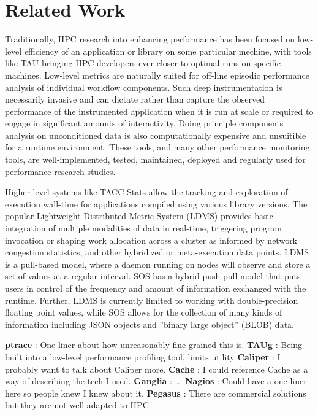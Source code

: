 \section{Related Work}

Traditionally, HPC research into enhancing performance has been
focused on low-level efficiency of an application or library on some
particular mechine, with tools like TAU bringing HPC developers ever
closer to optimal runs on specific machines.
%
Low-level metrics are naturally suited for off-line episodic
performance analysis of individual workflow components.
%
Such deep instrumentation is necessarily invasive and can dictate
rather than capture the observed performance of the instrumented
application when it is run at scale or required to engage in
significant amounts of interactivity.
%
Doing principle components analysis on unconditioned data is also
computationally expensive and unsuitible for a runtime environment.
%
These tools, and many other performance monitoring tools, are
well-implemented, tested, maintained, deployed and regularly used for
performance research studies.

Higher-level systems like TACC Stats \cite{evans2014comprehensive}
allow the tracking and exploration of execution wall-time for
applications compiled using various library versions.
%
The popular Lightweight Distributed Metric System (LDMS)
\cite{agelastos2014lightweight} provides basic integration of multiple
modalities of data in real-time, triggering program invocation or
shaping work allocation across a cluster as informed by network
congestion statistics, and other hybridized or meta-execution data
points.
%
LDMS is a pull-based model, where a daemon running on nodes will
observe and store a set of values at a regular interval.
%
SOS has a hybrid push-pull model that puts users in control of the
frequency and amount of information exchanged with the runtime.
%
Further, LDMS is currently limited to working with double-precision
floating point values, while SOS allows for the collection of many
kinds of information including JSON objects and ''binary large
object'' (BLOB) data.


\textbf{ptrace} : One-liner about how unreasonably fine-grained this is.
\textbf{TAUg} : Being built into a low-level performance profiling tool, limits utility
\textbf{Caliper} : I probably want to talk about Caliper more.
\textbf{Cache} : I could reference Cache as a way of describing the tech I used.
\textbf{Ganglia} : ...
\textbf{Nagios} : Could have a one-liner here so people knew I knew about it.
\textbf{Pegasus} : There are commercial solutions but they are not well adapted to HPC.







